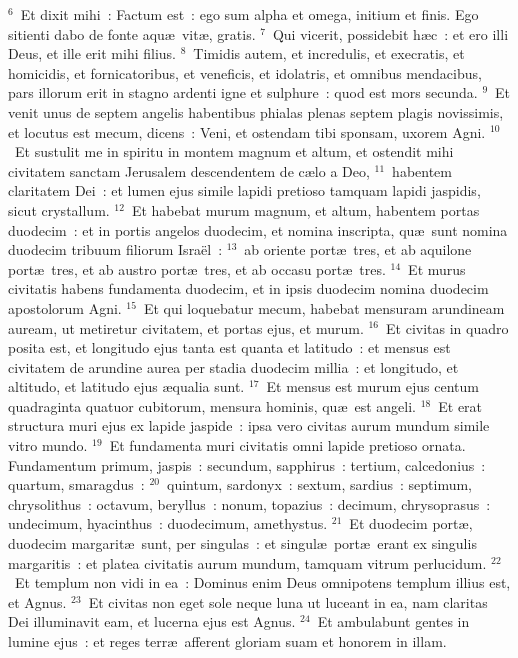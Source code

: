 ${}^{6}$~Et dixit mihi~: Factum est~: ego sum alpha et omega, initium et finis. Ego sitienti dabo de fonte aqu\ae\ vit\ae , gratis.
${}^{7}$~Qui vicerit, possidebit h\ae c~: et ero illi Deus, et ille erit mihi filius.
${}^{8}$~Timidis autem, et incredulis, et execratis, et homicidis, et fornicatoribus, et veneficis, et idolatris, et omnibus mendacibus, pars illorum erit in stagno ardenti igne et sulphure~: quod est mors secunda.
${}^{9}$~Et venit unus de septem angelis habentibus phialas plenas septem plagis novissimis, et locutus est mecum, dicens~: Veni, et ostendam tibi sponsam, uxorem Agni.
${}^{10}$~Et sustulit me in spiritu in montem magnum et altum, et ostendit mihi civitatem sanctam Jerusalem descendentem de c\ae lo a Deo,
${}^{11}$~habentem claritatem Dei~: et lumen ejus simile lapidi pretioso tamquam lapidi jaspidis, sicut crystallum.
${}^{12}$~Et habebat murum magnum, et altum, habentem portas duodecim~: et in portis angelos duodecim, et nomina inscripta, qu\ae\ sunt nomina duodecim tribuum filiorum Isra\"el~:
${}^{13}$~ab oriente port\ae\ tres, et ab aquilone port\ae\ tres, et ab austro port\ae\ tres, et ab occasu port\ae\ tres.
${}^{14}$~Et murus civitatis habens fundamenta duodecim, et in ipsis duodecim nomina duodecim apostolorum Agni.
${}^{15}$~Et qui loquebatur mecum, habebat mensuram arundineam auream, ut metiretur civitatem, et portas ejus, et murum.
${}^{16}$~Et civitas in quadro posita est, et longitudo ejus tanta est quanta et latitudo~: et mensus est civitatem de arundine aurea per stadia duodecim millia~: et longitudo, et altitudo, et latitudo ejus \ae qualia sunt.
${}^{17}$~Et mensus est murum ejus centum quadraginta quatuor cubitorum, mensura hominis, qu\ae\ est angeli.
${}^{18}$~Et erat structura muri ejus ex lapide jaspide~: ipsa vero civitas aurum mundum simile vitro mundo.
${}^{19}$~Et fundamenta muri civitatis omni lapide pretioso ornata. Fundamentum primum, jaspis~: secundum, sapphirus~: tertium, calcedonius~: quartum, smaragdus~:
${}^{20}$~quintum, sardonyx~: sextum, sardius~: septimum, chrysolithus~: octavum, beryllus~: nonum, topazius~: decimum, chrysoprasus~: undecimum, hyacinthus~: duodecimum, amethystus.
${}^{21}$~Et duodecim port\ae , duodecim margarit\ae\ sunt, per singulas~: et singul\ae\ port\ae\ erant ex singulis margaritis~: et platea civitatis aurum mundum, tamquam vitrum perlucidum.
${}^{22}$~Et templum non vidi in ea~: Dominus enim Deus omnipotens templum illius est, et Agnus.
${}^{23}$~Et civitas non eget sole neque luna ut luceant in ea, nam claritas Dei illuminavit eam, et lucerna ejus est Agnus.
${}^{24}$~Et ambulabunt gentes in lumine ejus~: et reges terr\ae\ afferent gloriam suam et honorem in illam.
